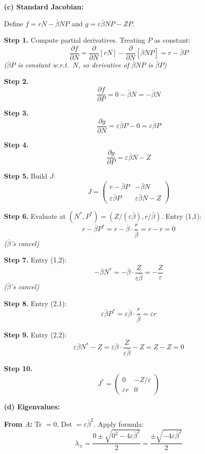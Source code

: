\documentclass[10pt]{article}
\newcommand{\stepwhy}[1]{\textcolor{blue!60!black}{\small\textit{(#1)}}}
\begin{document}
\begin{solution}
\medskip\textbf{(c) Standard Jacobian:}

Define $f = rN - \bar\beta NP$ and $g = \varepsilon\bar\beta NP - ZP$.

\textbf{Step 1.} Compute partial derivatives. Treating $P$ as constant:
\[
\frac{\partial f}{\partial N} = \frac{\partial}{\partial N}[rN] - \frac{\partial}{\partial N}[\bar\beta NP] = r - \bar\beta P
\]
\stepwhy{$\bar\beta P$ is constant w.r.t.\ $N$, so derivative of $\bar\beta NP$ is $\bar\beta P$}

\textbf{Step 2.}
\[
\frac{\partial f}{\partial P} = 0 - \bar\beta N = -\bar\beta N
\]

\textbf{Step 3.}
\[
\frac{\partial g}{\partial N} = \varepsilon\bar\beta P - 0 = \varepsilon\bar\beta P
\]

\textbf{Step 4.}
\[
\frac{\partial g}{\partial P} = \varepsilon\bar\beta N - Z
\]

\textbf{Step 5.} Build $J$:
\[
J = \begin{pmatrix} r - \bar\beta P & -\bar\beta N \\ \varepsilon\bar\beta P & \varepsilon\bar\beta N - Z \end{pmatrix}
\]

\textbf{Step 6.} Evaluate at $(N^*, P^*) = (Z/(\varepsilon\bar\beta), r/\bar\beta)$. Entry (1,1):
\[
r - \bar\beta P^* = r - \bar\beta\cdot\frac{r}{\bar\beta} = r - r = 0
\]
\stepwhy{$\bar\beta$'s cancel}

\textbf{Step 7.} Entry (1,2):
\[
-\bar\beta N^* = -\bar\beta\cdot\frac{Z}{\varepsilon\bar\beta} = -\frac{Z}{\varepsilon}
\]
\stepwhy{$\bar\beta$'s cancel}

\textbf{Step 8.} Entry (2,1):
\[
\varepsilon\bar\beta P^* = \varepsilon\bar\beta\cdot\frac{r}{\bar\beta} = \varepsilon r
\]

\textbf{Step 9.} Entry (2,2):
\[
\varepsilon\bar\beta N^* - Z = \varepsilon\bar\beta\cdot\frac{Z}{\varepsilon\bar\beta} - Z = Z - Z = 0
\]

\textbf{Step 10.}
\[
\boxed{J^* = \begin{pmatrix} 0 & -Z/\varepsilon \\ \varepsilon r & 0 \end{pmatrix}}
\]

\medskip\textbf{(d) Eigenvalues:}

\textbf{From $A$:} Tr $= 0$, Det $= \varepsilon\bar\beta^2$. Apply formula:
\[
\lambda_\pm = \frac{0 \pm \sqrt{0^2 - 4\varepsilon\bar\beta^2}}{2} = \frac{\pm\sqrt{-4\varepsilon\bar\beta^2}}{2}
\]


\end{solution}
\end{document}

